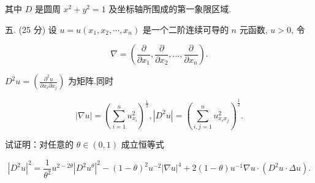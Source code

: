 \documentclass{examcollection}
\renewcommand{\displayformula}[1]{\[#1\]}
\begin{document}
{\begin{minipage}{\textwidth}
其中 $D$ 是圆周 $x^{2} + y^{2} = 1$ 及坐标轴所围成的第一象限区域.\par
五. (25 分) 设 $u = u(x_{1}, x_{2}, \cdots, x_{n})$ 是一个二阶连续可导的 $n$ 元函数, $u > 0$, 令\par
\displayformula{\nabla = \left(\frac {\partial}{\partial x _ {1}}, \frac {\partial}{\partial x _ {2}}, \dots , \frac {\partial}{\partial x _ {n}}\right).}\par
$D^2 u = \left(\frac{\partial^2u}{\partial x_i\partial x_j}\right)$ 为矩阵.同时\par
\displayformula{| \nabla u | = \left(\sum_ {i = 1} ^ {n} u _ {x _ {i}} ^ {2}\right) ^ {\frac {1}{2}}, | D ^ {2} u | = \left(\sum_ {i, j = 1} ^ {n} u _ {x _ {i} x _ {j}} ^ {2}\right) ^ {\frac {1}{2}}.}\par
试证明：对任意的 $\theta \in (0,1)$ 成立恒等式\par
\displayformula{| D ^ {2} u | ^ {2} = \frac {1}{\theta^ {2}} u ^ {2 - 2 \theta} | D ^ {2} u ^ {\theta} | ^ {2} - (1 - \theta) ^ {2} u ^ {- 2} | \nabla u | ^ {4} + 2 (1 - \theta) u ^ {- 1} \nabla u \cdot (D ^ {2} u \cdot \Delta u).}\par
\end{minipage}}
\ifdim\dimexpr\ht\proofbox+\dp\proofbox\relax>\textheight
\noindent\resizebox{!}{\textheight}{\usebox{\proofbox}}\else\noindent\usebox{\proofbox}\fi\clearpage
\end{document}
